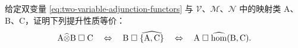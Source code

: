 \begin{exercise}\label{ex:leibniz-lifting-equivalences}
给定双变量\trAdjunction{} \eqref{eq:two-variable-adjunction-functors} 与
$\mathcal{V}$、$\mathcal{M}$、$\mathcal{N}$ 中的映射类 $\mathrm{A}$、
$\mathrm{B}$、$\mathrm{C}$，证明下列提升性质等价：
\[ \mathrm{A}\widehat{\otimes}\mathrm{B}\mathrel{\square}\mathrm{C}
   \quad\Leftrightarrow\quad
   \mathrm{B}\mathrel{\square}\widehat{\{\mathrm{A},\mathrm{C}\}}
   \quad\Leftrightarrow\quad
   \mathrm{A}\mathrel{\square}\widehat{\mathrm{hom}}(\mathrm{B},\mathrm{C}). \]
\end{exercise}


